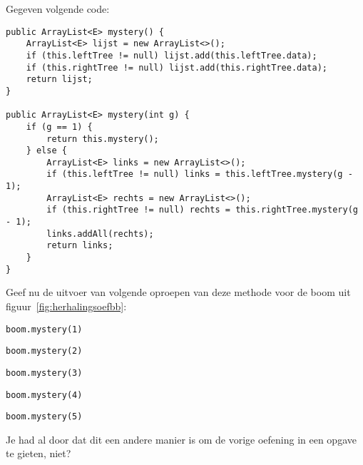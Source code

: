 \begin{oef}
\papier Gegeven volgende code:
\begin{lstlisting}[caption={Mystery methode}, label=herhoefmystery]
public ArrayList<E> mystery() {
	ArrayList<E> lijst = new ArrayList<>();
	if (this.leftTree != null) lijst.add(this.leftTree.data);
	if (this.rightTree != null) lijst.add(this.rightTree.data);
	return lijst;
}

public ArrayList<E> mystery(int g) {
	if (g == 1) {
		return this.mystery();
	} else {
		ArrayList<E> links = new ArrayList<>();
		if (this.leftTree != null) links = this.leftTree.mystery(g - 1);
		ArrayList<E> rechts = new ArrayList<>();
		if (this.rightTree != null) rechts = this.rightTree.mystery(g - 1);
		links.addAll(rechts);
		return links;
	}
}
 \end{lstlisting}
 Geef nu de uitvoer van volgende oproepen van deze methode voor de boom uit figuur~\ref{fig:herhalingsoefbb}:
 \begin{oefenumerate}
 \item \verb+boom.mystery(1)+
 \item \verb+boom.mystery(2)+
 \item \verb+boom.mystery(3)+
 \item \verb+boom.mystery(4)+
 \item \verb+boom.mystery(5)+
 \end{oefenumerate}

\begin{opl}
Je had al door dat dit een andere manier is om de vorige oefening in een opgave te gieten, niet?
\end{opl}
\end{oef}




